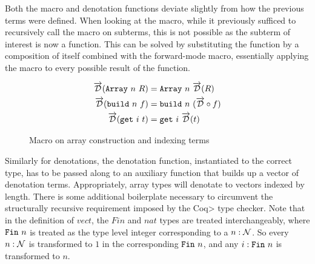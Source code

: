   Both the macro and denotation functions deviate slightly from how the previous terms were defined.
  When looking at the macro, while it previously sufficed to recursively call the macro on subterms, this is not possible as the subterm of interest is now a function.
  This can be solved by substituting the function by a composition of itself combined with the forward-mode macro, essentially applying the macro to every possible result of the function.

  \begin{figure}
    \centering
    \begin{equation*}
      \begin{split}
        \overrightarrow{\mathcal{D}}(\texttt{Array}\ n\ R) &= \texttt{Array}\ n\ \overrightarrow{\mathcal{D}}(R) \\
        \overrightarrow{\mathcal{D}}(\texttt{build}\ n\ f) &= \texttt{build}\ n\ (\overrightarrow{\mathcal{D}} \circ f) \\
        \overrightarrow{\mathcal{D}}(\texttt{get}\ i\ t) &= \texttt{get}\ i\ \overrightarrow{\mathcal{D}}(t)
      \end{split}
    \end{equation*}
    \caption{Macro on array construction and indexing terms}
    \label{eqn:macro_array}
  \end{figure}

  Similarly for denotations, the denotation function, instantiated to the correct type, has to be passed along to an auxiliary function that builds up a vector of denotation terms.
  Appropriately, array types will denotate to vectors indexed by length.
  There is some additional boilerplate necessary to circumvent the structurally recursive requirement imposed by the \<Coq> type checker.
  Note that in the definition of $vect$, the $Fin$ and $nat$ types are treated interchangeably, where $\texttt{Fin}\ n$ is treated as the type level integer corresponding to a $n : \mathcal{N}$.
  So every $n : \mathcal{N}$ is transformed to $1$ in the corresponding $\texttt{Fin}\ n$, and any $i : \texttt{Fin}\ n$ is transformed to $n$.


